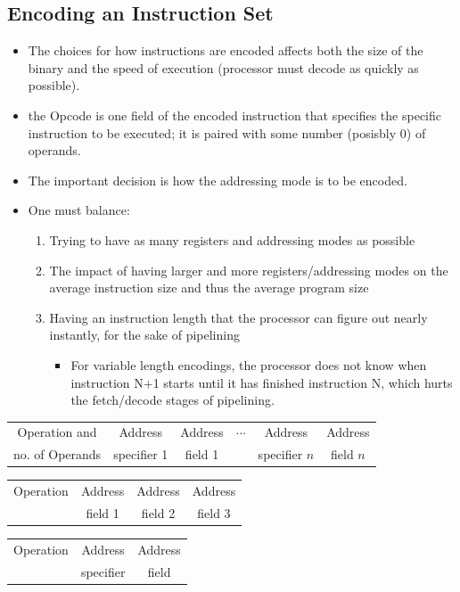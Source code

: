 \documentclass[11pt, a4paper]{article}
\theoremstyle{definition}
\theoremstyle{remark}
\begin{document}
\subsection{Encoding an Instruction Set}
\begin{itemize}
  \item The choices for how instructions are encoded affects both the size of the binary and the speed of execution (processor must decode as quickly as possible).
  \item the Opcode is one field of the encoded instruction that specifies the specific instruction to be executed; it is paired with some number (posisbly 0) of operands.
  \item The important decision is how the addressing mode is to be encoded.
  \item One must balance: 
  \begin{enumerate}
    \item Trying to have as many registers and addressing modes as possible
    \item The impact of having larger and more registers/addressing modes on the average instruction size and thus the average program size 
    \item Having an instruction length that the processor can figure out nearly instantly, for the sake of pipelining
    \begin{itemize}
      \item For variable length encodings, the processor does not know when instruction N+1 starts until it has finished instruction N, which hurts the fetch/decode stages of pipelining.
    \end{itemize}
  \end{enumerate}
\end{itemize}
\begin{tabular}{|c|c|c|c|c|c|}
\hline
Operation and & Address & Address & $\cdots$ & Address & Address \\
no. of Operands & specifier 1 & field 1 & & specifier $n$ & field $n$\\ 
\hline
\end{tabular}
\begin{tabular}{|c|c|c|c|}
\hline
Operation & Address & Address & Address \\
& field 1 & field 2 & field 3 \\
\hline 
\end{tabular}
\begin{tabular}{|c|c|c|}
\hline
Operation & Address & Address \\ 
& specifier & field \\ 
\hline
\end{tabular} \\
\end{document}
